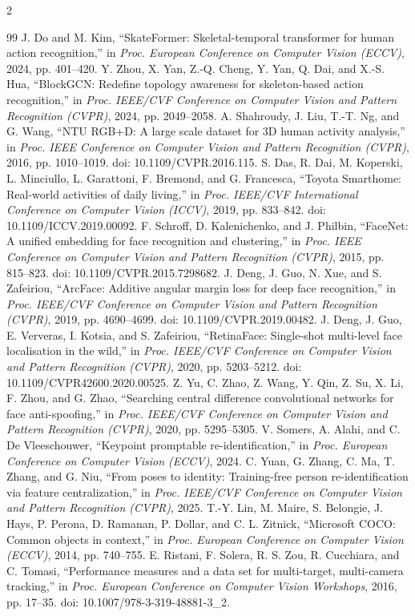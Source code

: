 \documentclass[a4paper, twoside, 10pt]{article}
\begin{document}
\begin{multicols}{2}
{\begin{thebibliography}{99}
 J. Do and M. Kim, ``SkateFormer: Skeletal-temporal transformer for human action recognition,'' in \textit{Proc. European Conference on Computer Vision (ECCV)}, 2024, pp. 401--420.
 Y. Zhou, X. Yan, Z.-Q. Cheng, Y. Yan, Q. Dai, and X.-S. Hua, ``BlockGCN: Redefine topology awareness for skeleton-based action recognition,'' in \textit{Proc. IEEE/CVF Conference on Computer Vision and Pattern Recognition (CVPR)}, 2024, pp. 2049--2058.
 A. Shahroudy, J. Liu, T.-T. Ng, and G. Wang, ``NTU RGB+D: A large scale dataset for 3D human activity analysis,'' in \textit{Proc. IEEE Conference on Computer Vision and Pattern Recognition (CVPR)}, 2016, pp. 1010--1019. doi: 10.1109/CVPR.2016.115.
 S. Das, R. Dai, M. Koperski, L. Minciullo, L. Garattoni, F. Bremond, and G. Francesca, ``Toyota Smarthome: Real-world activities of daily living,'' in \textit{Proc. IEEE/CVF International Conference on Computer Vision (ICCV)}, 2019, pp. 833--842. doi: 10.1109/ICCV.2019.00092.
 F. Schroff, D. Kalenichenko, and J. Philbin, ``FaceNet: A unified embedding for face recognition and clustering,'' in \textit{Proc. IEEE Conference on Computer Vision and Pattern Recognition (CVPR)}, 2015, pp. 815--823. doi: 10.1109/CVPR.2015.7298682.
 J. Deng, J. Guo, N. Xue, and S. Zafeiriou, ``ArcFace: Additive angular margin loss for deep face recognition,'' in \textit{Proc. IEEE/CVF Conference on Computer Vision and Pattern Recognition (CVPR)}, 2019, pp. 4690--4699. doi: 10.1109/CVPR.2019.00482.
 J. Deng, J. Guo, E. Ververas, I. Kotsia, and S. Zafeiriou, ``RetinaFace: Single-shot multi-level face localisation in the wild,'' in \textit{Proc. IEEE/CVF Conference on Computer Vision and Pattern Recognition (CVPR)}, 2020, pp. 5203--5212. doi: 10.1109/CVPR42600.2020.00525.
 Z. Yu, C. Zhao, Z. Wang, Y. Qin, Z. Su, X. Li, F. Zhou, and G. Zhao, ``Searching central difference convolutional networks for face anti-spoofing,'' in \textit{Proc. IEEE/CVF Conference on Computer Vision and Pattern Recognition (CVPR)}, 2020, pp. 5295--5305.
 V. Somers, A. Alahi, and C. De Vleeschouwer, ``Keypoint promptable re-identification,'' in \textit{Proc. European Conference on Computer Vision (ECCV)}, 2024.
 C. Yuan, G. Zhang, C. Ma, T. Zhang, and G. Niu, ``From poses to identity: Training-free person re-identification via feature centralization,'' in \textit{Proc. IEEE/CVF Conference on Computer Vision and Pattern Recognition (CVPR)}, 2025.
 T.-Y. Lin, M. Maire, S. Belongie, J. Hays, P. Perona, D. Ramanan, P. Dollar, and C. L. Zitnick, ``Microsoft COCO: Common objects in context,'' in \textit{Proc. European Conference on Computer Vision (ECCV)}, 2014, pp. 740--755.
 E. Ristani, F. Solera, R. S. Zou, R. Cucchiara, and C. Tomasi, ``Performance measures and a data set for multi-target, multi-camera tracking,'' in \textit{Proc. European Conference on Computer Vision Workshops}, 2016, pp. 17--35. doi: 10.1007/978-3-319-48881-3\_2.
\end{thebibliography}
}

\end{multicols}
\end{document}
